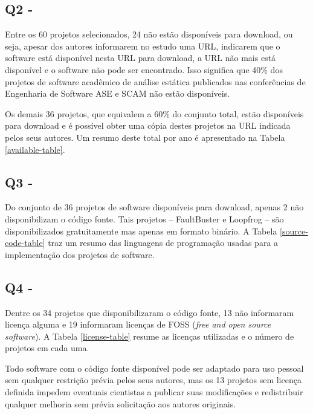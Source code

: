 \subsection{Q2 - \EstudoUmQuestaoDois} %

Entre os 60 projetos selecionados, 24 não estão disponíveis para download, ou
seja, apesar dos autores informarem no estudo uma URL, indicarem que o software
está disponível nesta URL para download, a URL não mais está disponível e o
software não pode ser encontrado. Isso significa que 40\% dos projetos de software
acadêmico de análise estática publicados nas conferências de Engenharia de
Software ASE e SCAM não estão disponíveis.

Os demais 36 projetos, que equivalem a 60\% do conjunto total, estão
disponíveis para download e é possível obter uma cópia destes projetos na URL
indicada pelos seus autores. Um resumo deste total por ano é apresentado na
Tabela \ref{available-table}.



\subsection{Q3 - \EstudoUmQuestaoTres} %

Do conjunto de 36 projetos de software disponíveis para download, apenas 2 não
disponibilizam o código fonte. Tais projetos -- FaultBuster e Loopfrog --
são disponibilizados gratuitamente mas apenas em
formato binário. A Tabela \ref{source-code-table} traz um resumo das
linguagens de programação usadas para a implementação dos projetos de software.



\subsection{Q4 - \EstudoUmQuestaoQuatro} %

Dentre os 34 projetos que disponibilizaram o código fonte, 13 não informaram
licença alguma e 19 informaram licenças de FOSS ({\it free and open source
software}). A Tabela \ref{license-table} resume as licenças utilizadas e o
número de projetos em cada uma.



Todo software com o código fonte disponível pode ser adaptado para uso pessoal
sem qualquer restrição prévia pelos seus autores, mas os 13 projetos sem
licença definida impedem eventuais cientistas a publicar suas modificações e
redistribuir qualquer melhoria sem prévia solicitação aos autores originais.

